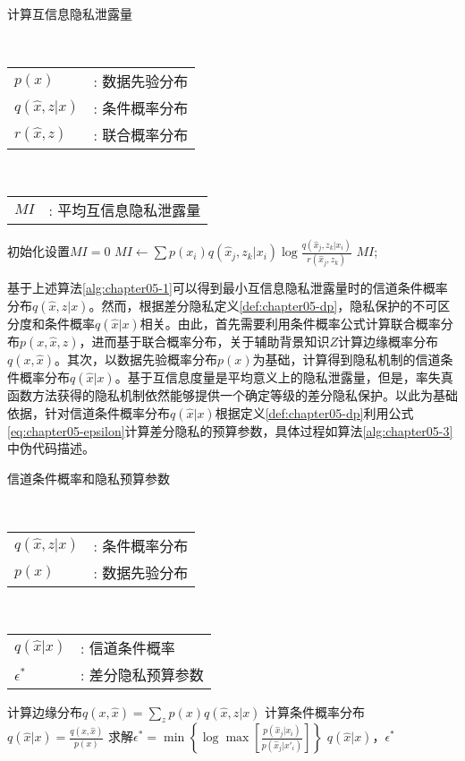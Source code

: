 \begin{algorithm}[htb]
 \small
\caption{ 计算互信息隐私泄露量}
\label{alg:chapter05-2}
\begin{algorithmic}[1]
\REQUIRE ~~\\
\begin{tabular}[t]{p{8mm}l}
 $p(x)$&: 数据先验分布\\
 $q(\hat{x},z|x)$&: 条件概率分布\\
 $r(\hat{x},z)$&: 联合概率分布
\end{tabular}
\ENSURE ~~\\
\begin{tabular}[t]{p{8mm}l}
$MI$&: 平均互信息隐私泄露量
\end{tabular}
\STATE 初始化设置$MI = 0$
\STATE $MI \leftarrow \sum p(x_i)q(\hat{x}_j,z_k|x_i) \log \frac{q(\hat{x}_j,z_k|x_i)}{r(\hat{x}_j,z_k)}$
\ENDFOR
\RETURN $MI$;
\end{algorithmic}
\end{algorithm}

基于上述算法\ref{alg:chapter05-1}可以得到最小互信息隐私泄露量时的信道条件概率分布$q(\hat{x},z|x)$。然而，根据差分隐私定义\ref{def:chapter05-dp}，隐私保护的不可区分度和条件概率$q(\hat{x}|x)$相关。由此，首先需要利用条件概率公式计算联合概率分布$p(x,\hat{x},z)$，进而基于联合概率分布，关于辅助背景知识$Z$计算边缘概率分布$q(x,\hat{x})$。其次，以数据先验概率分布$p(x)$为基础，计算得到隐私机制的信道条件概率分布$q(\hat{x}|x)$。基于互信息度量是平均意义上的隐私泄露量，但是，率失真函数方法获得的隐私机制依然能够提供一个确定等级的差分隐私保护\cite{wang2016on,mir2012information}。以此为基础依据，针对信道条件概率分布$q(\hat{x}|x)$根据定义\ref{def:chapter05-dp}利用公式\ref{eq:chapter05-epsilon}计算差分隐私的预算参数，具体过程如算法\ref{alg:chapter05-3}中伪代码描述。
\begin{algorithm}[htb]
\caption{信道条件概率和隐私预算参数}
\label{alg:chapter05-3}
 \small
\begin{algorithmic}[1]
\REQUIRE ~~\\
\begin{tabular}[t]{p{8mm}l}
 $q(\hat{x},z|x)$&: 条件概率分布\\
 $p(x)$&: 数据先验分布
\end{tabular}
\ENSURE ~~\\
\begin{tabular}[t]{p{8mm}l}
$q(\hat{x}|x)$&: 信道条件概率\\
$\epsilon^*$  &: 差分隐私预算参数
\end{tabular}
\STATE 计算边缘分布$q(x,\hat{x})=\sum_{z}p(x)q(\hat{x},z|x)$
\STATE 计算条件概率分布$q(\hat{x}|x)=\frac{q(x,\hat{x})}{p(x)}$
\STATE 求解$\epsilon^* = \min \left\{\log \max \left[\frac{p(\hat{x}_j|x_i)}{p(\hat{x}_j|x'_i)}\right]\right\}$
\ENDFOR
\RETURN $q(\hat{x}|x)$，$\epsilon^*$
\end{algorithmic}
\end{algorithm}

